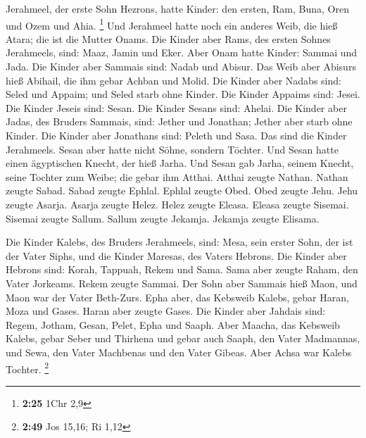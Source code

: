  Jerahmeel, der erste Sohn Hezrons, hatte Kinder: den
ersten, Ram, Buna, Oren und Ozem und Ahia. \footnote{\textbf{2:25} 1Chr
  2,9}  Und Jerahmeel hatte noch ein anderes Weib, die hieß
Atara; die ist die Mutter Onams.  Die Kinder aber Rams, des
ersten Sohnes Jerahmeels, sind: Maaz, Jamin und Eker.  Aber
Onam hatte Kinder: Sammai und Jada. Die Kinder aber Sammais sind: Nadab
und Abisur.  Das Weib aber Abisurs hieß Abihail, die ihm
gebar Achban und Molid.  Die Kinder aber Nadabs sind: Seled
und Appaim; und Seled starb ohne Kinder.  Die Kinder
Appaims sind: Jesei. Die Kinder Jeseis sind: Sesan. Die Kinder Sesans
sind: Ahelai.  Die Kinder aber Jadas, des Bruders Sammais,
sind: Jether und Jonathan; Jether aber starb ohne Kinder. 
Die Kinder aber Jonathans sind: Peleth und Sasa. Das sind die Kinder
Jerahmeels.  Sesan aber hatte nicht Söhne, sondern Töchter.
Und Sesan hatte einen ägyptischen Knecht, der hieß Jarha. 
Und Sesan gab Jarha, seinem Knecht, seine Tochter zum Weibe; die gebar
ihm Atthai.  Atthai zeugte Nathan. Nathan zeugte Sabad.
 Sabad zeugte Ephlal. Ephlal zeugte Obed. 
Obed zeugte Jehu. Jehu zeugte Asarja.  Asarja zeugte Helez.
Helez zeugte Eleasa.  Eleasa zeugte Sisemai. Sisemai zeugte
Sallum.  Sallum zeugte Jekamja. Jekamja zeugte Elisama.

 Die Kinder Kalebs, des Bruders Jerahmeels, sind: Mesa,
sein erster Sohn, der ist der Vater Siphs, und die Kinder Maresas, des
Vaters Hebrons.  Die Kinder aber Hebrons sind: Korah,
Tappuah, Rekem und Sama.  Sama aber zeugte Raham, den Vater
Jorkeams. Rekem zeugte Sammai.  Der Sohn aber Sammais hieß
Maon, und Maon war der Vater Beth-Zurs.  Epha aber, das
Kebsweib Kalebs, gebar Haran, Moza und Gases. Haran aber zeugte Gases.
 Die Kinder aber Jahdais sind: Regem, Jotham, Gesan, Pelet,
Epha und Saaph.  Aber Maacha, das Kebsweib Kalebs, gebar
Seber und Thirhena  und gebar auch Saaph, den Vater
Madmannas, und Sewa, den Vater Machbenas und den Vater Gibeas. Aber
Achsa war Kalebs Tochter. \footnote{\textbf{2:49} Jos 15,16; Ri 1,12}

